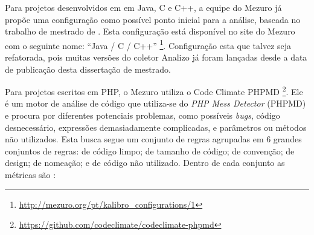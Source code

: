 
Para projetos desenvolvidos em em Java, C e C++, a equipe do Mezuro já propõe
uma configuração como possível ponto inicial para a análise, baseada no trabalho
de mestrado de . Esta configuração está disponível no site do
Mezuro com o seguinte nome: ``Java / C / C++''
\footnote{\url{http://mezuro.org/pt/kalibro_configurations/1}}. Configuração
esta que talvez seja refatorada, pois muitas versões do coletor Analizo já foram
lançadas desde a data de publicação desta dissertação de mestrado.

Para projetos escritos em PHP, o Mezuro utiliza o Code Climate PHPMD
\footnote{\url{https://github.com/codeclimate/codeclimate-phpmd}}.
Ele é um motor de análise de código que utiliza-se do \textit{PHP Mess Detector}
(PHPMD) e procura por diferentes potenciais problemas, como possíveis \textit{bugs},
código desnecessário, expressões demasiadamente complicadas, e parâmetros ou
métodos não utilizados. Esta busca segue um conjunto de regras agrupadas em 6
grandes conjuntos de regras: de código limpo; de tamanho de código; de
convenção; de design; de nomeação; e de código não utilizado. Dentro de cada
conjunto as métricas são \cite{PichlerPHPMD}:


